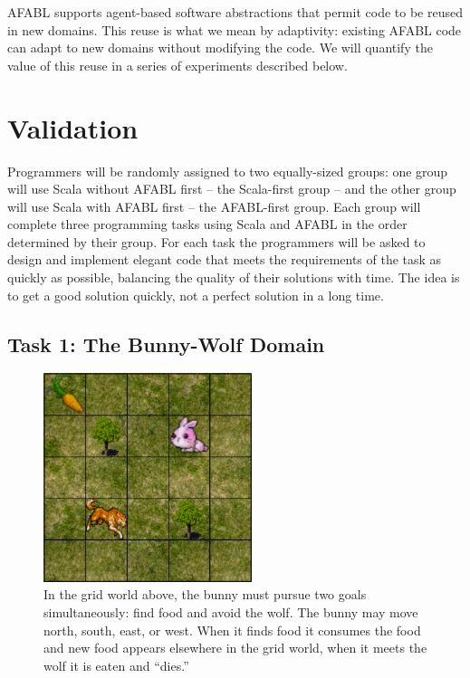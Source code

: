 AFABL supports agent-based software abstractions that permit code to be reused in new domains.  This reuse is what we mean by adaptivity: existing AFABL code can adapt to new domains without modifying the code.  We will quantify the value of this reuse in a series of
experiments described below.

\section{Validation}

Programmers will be randomly assigned to two equally-sized groups: one group will use Scala without AFABL first -- the Scala-first group -- and the other group will use Scala with AFABL first -- the AFABL-first group.  Each group will complete three programming tasks using Scala and AFABL in the order determined by their group.  For each task the programmers will be asked to design and implement elegant code that meets the requirements of the task as quickly as possible, balancing the quality of their solutions with time.  The idea is to get a good solution quickly, not a perfect solution in a long time.

\subsection{Task 1: The Bunny-Wolf Domain}\label{sec:task1}

\begin{figure}[h]

\begin{center}
\includegraphics[height=2.4in]{bunny.png}
\end{center}


\caption{In the grid world above, the bunny must pursue two goals
  simultaneously: find food and avoid the wolf.  The bunny may move
  north, south, east, or west.  When it finds food it consumes the
  food and new food appears elsewhere in the grid world, when it meets
  the wolf it is eaten and ``dies.''}
\label{fig:bunny-picture}
\end{figure}

